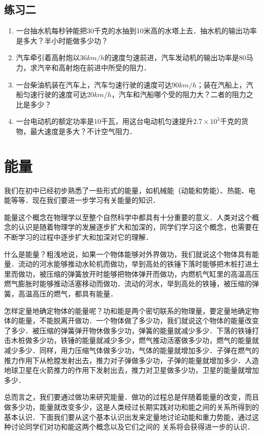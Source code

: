 \subsection*{练习二}
\begin{enumerate}
    \item 一台抽水机每秒钟能把30千克的水抽到10米高的水塔上去．抽水机的输出功率是多大？半小时能做多少功？
    \item 汽车牵引着高射炮以36$\si{km/h}$的速度匀速前进，汽车发动机的输出功率是80马力，求汽辛和高射炮在前进中所受的阻力．
    \item 一台柴油机装在汽车上，汽车匀速行驶的速度可达90$\si{km/h}$；装在汽船上，汽船匀速行驶的速度可达20$\si{km/h}$，汽车和汽船哪个受的阻力大？二者的阻力之比是多少？
    \item 一台电动机的额定功率是10千瓦，用这台电动机匀速提升$2.7\times 10^3$千克的货物，最大速度是多大？不计空气阻力．
\end{enumerate}
\newpage
\section{能量}
我们在初中已经初步熟悉了一些形式的能量，如机械能（动能和势能）、热能、电能等等．现在我们要进一步学习有关能量的知识．

能量这个概念在物理学以至整个自然科学中都具有十分重要的意义．人类对这个概念的认识是随着物理学的发展逐步扩大和加深的，同学们学习这个概念，也需要在不断学习的过程中逐步扩大和加深对它的理解．

什么是能量？粗浅地说，如果一个物体能够对外界做功，我们就说这个物体具有能量．流动的河水能够推动水轮机而做功，举到高处的铁锤下落时能够把木桩打进土里而做功，被压缩的弹簧放开时能够把物体弹开而做功，内燃机气缸里的高温高压燃气膨胀时能够推动活塞移动而做功．流动的河水，举到高处的铁锤，被压缩的弹簧，高温高压的燃气，都具有能量．

怎样定量地确定物体的能量呢？功和能是两个密切联系的物理量，要定量地确定物体的能量，不能脱离开做功．一个物体做了多少功，我们就说这个物体的能量改变了多少．被压缩的弹簧弹开物休做多少功，弹簧的能量就减少多少．下落的铁锤打击木桩做多少功，铁锤的能量就减少多少，燃气推动活塞做多少功，燃气的能量就减少多少．同样，用力压缩气体做多少功，气体的能量就增加多少．子弹在燃气的推力作用下从枪膛发射出去，推力对子弹做多少功，子弹的能量就增加多少．人造地球卫星在火箭推力的作用下发射出去，推力对卫星做多少功，卫星的能量就增加多少．

总而言之，我们要通过做功来研究能量．做功的过程总是伴随着能量的改变，而且做多少功，能量就改变多少，这是人类经过长期实践对功和能之间的关系所得到的基本认识．下面我们要从这个基本认识出发来定量地讨论动能和重力势能，通过这种讨论同学们对功和能这两个概念以及它们之间的
关系将会获得进一步的认识．
\newpage
